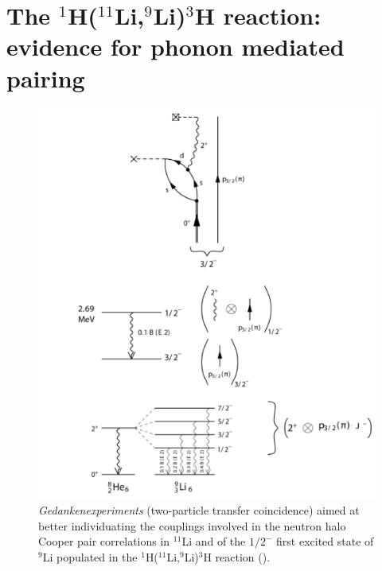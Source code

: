  \section[Evidence for phonon mediated pairing]{The $^1$H($^{11}$Li,$^9$Li)$^3$H reaction: evidence for phonon mediated pairing}\label{C8S1}
    \begin{figure}
    \centerline{\includegraphics*[width=16cm,angle=0]{C8/figsC8/fig8_1_3x}}
    	\caption{\emph{Gedankenexperiments} (two-particle transfer coincidence) aimed at better individuating the couplings involved in the neutron halo Cooper pair correlations in $^{11}$Li and of the $1/2^-$ first excited state of $^9$Li populated in the  
    	 $^1$H($^{11}$Li,$^9$Li)$^3$H  reaction (\cite{Tanihata:08,Barranco:01,Potel:10}).}\label{fig8_1_3}
    \end{figure}
